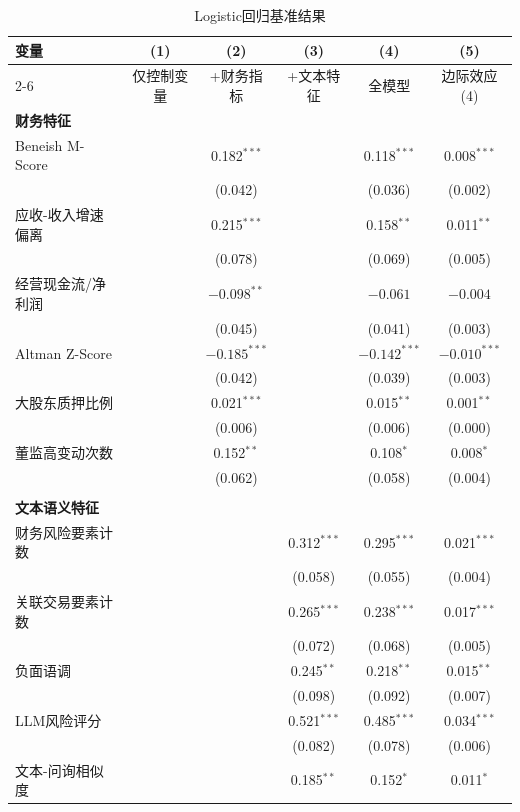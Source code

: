 \begin{table}[H]
\centering
\caption{Logistic回归基准结果}
\label{tab:logit_results}
\begin{threeparttable}
\small
\begin{tabular}{lccccc}
\toprule
变量 & (1) & (2) & (3) & (4) & (5) \\
\cmidrule{2-6}
 & 仅控制变量 & +财务指标 & +文本特征 & 全模型 & 边际效应(4) \\
\midrule
\textbf{财务特征} & & & & & \\
Beneish M-Score & & 0.182$^{***}$ & & 0.118$^{***}$ & 0.008$^{***}$ \\
 & & (0.042) & & (0.036) & (0.002) \\
应收-收入增速偏离 & & 0.215$^{***}$ & & 0.158$^{**}$ & 0.011$^{**}$ \\
 & & (0.078) & & (0.069) & (0.005) \\
经营现金流/净利润 & & $-0.098^{**}$ & & $-0.061$ & $-0.004$ \\
 & & (0.045) & & (0.041) & (0.003) \\
Altman Z-Score & & $-0.185^{***}$ & & $-0.142^{***}$ & $-0.010^{***}$ \\
 & & (0.042) & & (0.039) & (0.003) \\
大股东质押比例 & & 0.021$^{***}$ & & 0.015$^{**}$ & 0.001$^{**}$ \\
 & & (0.006) & & (0.006) & (0.000) \\
董监高变动次数 & & 0.152$^{**}$ & & 0.108$^{*}$ & 0.008$^{*}$ \\
 & & (0.062) & & (0.058) & (0.004) \\
\\
\textbf{文本语义特征} & & & & & \\
财务风险要素计数 & & & 0.312$^{***}$ & 0.295$^{***}$ & 0.021$^{***}$ \\
 & & & (0.058) & (0.055) & (0.004) \\
关联交易要素计数 & & & 0.265$^{***}$ & 0.238$^{***}$ & 0.017$^{***}$ \\
 & & & (0.072) & (0.068) & (0.005) \\
负面语调 & & & 0.245$^{**}$ & 0.218$^{**}$ & 0.015$^{**}$ \\
 & & & (0.098) & (0.092) & (0.007) \\
LLM风险评分 & & & 0.521$^{***}$ & 0.485$^{***}$ & 0.034$^{***}$ \\
 & & & (0.082) & (0.078) & (0.006) \\
文本-问询相似度 & & & 0.185$^{**}$ & 0.152$^{*}$ & 0.011$^{*}$ \\

\end{tabular}
\end{threeparttable}
\end{table}
